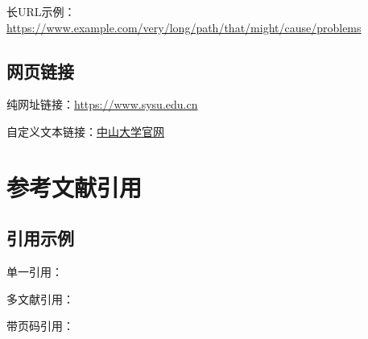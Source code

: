\documentclass[12pt]{ctexart}
\begin{document}
\begin{sloppypar}
长URL示例：\url{https://www.example.com/very/long/path/that/might/cause/problems}

\subsection{网页链接}
纯网址链接：\url{https://www.sysu.edu.cn}

自定义文本链接：\href{https://www.sysu.edu.cn}{中山大学官网}

\section{参考文献引用}
\subsection{引用示例}
单一引用：\cite{knuth1986texbook}

多文献引用：\cite{vaswani2017attention,brown2020language}

带页码引用：\cite[pp. 45-47]{wang2010zhongwen}

\newpage
{}



\end{sloppypar}
\end{document}

